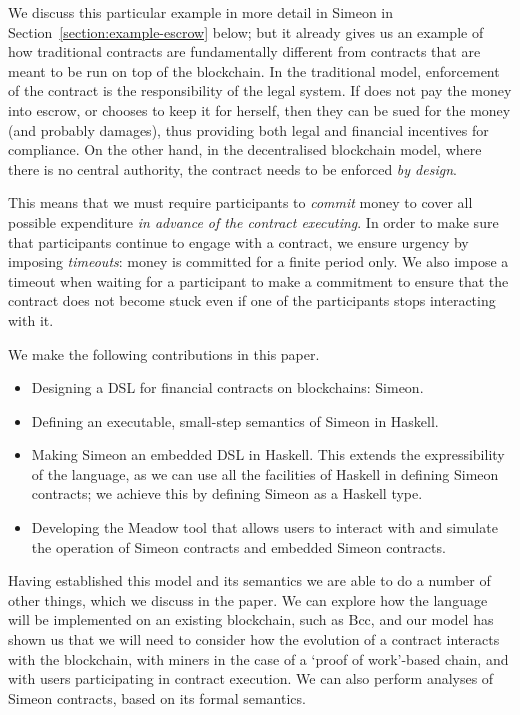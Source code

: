 \documentclass[runningheads]{llncs}
\begin{document}
We discuss this particular example in more detail in Simeon in Section~\ref{section:example-escrow} below; but it 
already gives us an example of how traditional contracts are fundamentally different from contracts that are meant to 
be run on top of the blockchain. In the traditional model, enforcement of the contract is the responsibility of the 
legal system. If  does not pay the money into escrow, or  chooses to keep it 
for herself, then they can be sued for the money (and probably damages), thus providing both legal and financial 
incentives for compliance. On the other hand, in the decentralised blockchain model, where there is no central 
authority, the contract needs to be enforced \emph{by design}.

This means that we must require participants to \emph{commit} money to cover all possible expenditure \emph{in advance 
of the contract executing}. In order to make sure that participants continue to engage with a contract, we ensure 
urgency by imposing \emph{timeouts}: money is committed for a finite period only. We also impose a timeout when waiting 
for a participant to make a commitment to ensure that the contract does not become stuck even if one of the participants 
stops interacting with it.

We make the following contributions in this paper.
\begin{itemize}
\item
Designing a DSL for financial contracts on blockchains: Simeon.
\item
Defining an executable, small-step semantics of Simeon in Haskell.
\item 
Making Simeon an embedded DSL in Haskell. This extends the expressibility of the language, as we can use all the 
facilities of Haskell in defining Simeon contracts; we achieve this by defining Simeon as  a Haskell 
 type.
\item
Developing the Meadow tool that allows users to interact with and simulate the operation of Simeon contracts 
and embedded Simeon contracts.
\end{itemize}

Having established this model and its semantics we are able to do a number of other things, which we discuss in the 
paper. We can explore how the language will be implemented on an existing blockchain, such as Bcc, and our model has 
shown us that we will need to consider how the evolution of a contract interacts with the blockchain, with miners in the 
case of a `proof of work'-based chain, and with users participating in contract execution. We can also perform analyses 
of Simeon contracts, based on its formal semantics. 
\end{document}
